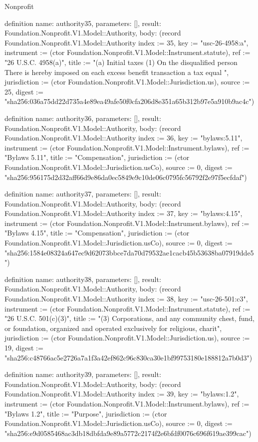 \begin{lexlean}{Nonprofit}
\begin{semanticmodule}
definition{
  name: authority35,
  parameters: [],
  result: Foundation.Nonprofit.V1.Model::Authority,
  body: (record Foundation.Nonprofit.V1.Model::Authority {index := 35, key := "usc-26-4958:a", instrument := (ctor Foundation.Nonprofit.V1.Model::Instrument.statute), ref := "26 U.S.C. 4958(a)", title := "(a) Initial taxes (1) On the disqualified person There is hereby imposed on each excess benefit transaction a tax equal ", jurisdiction := (ctor Foundation.Nonprofit.V1.Model::Jurisdiction.us), source := 25, digest := "sha256:036a75dd22d735a4e89ea49afe50f0cfa206d8e351a65b312b97e5a910b9ac4c"})
}

definition{
  name: authority36,
  parameters: [],
  result: Foundation.Nonprofit.V1.Model::Authority,
  body: (record Foundation.Nonprofit.V1.Model::Authority {index := 36, key := "bylaws:5.11", instrument := (ctor Foundation.Nonprofit.V1.Model::Instrument.bylaws), ref := "Bylaws 5.11", title := "Compensation", jurisdiction := (ctor Foundation.Nonprofit.V1.Model::Jurisdiction.usCo), source := 0, digest := "sha256:956175d2d32aff66d9e86da0ec5849e9c10de06c0795fc56792f2e97f5ecfdaf"})
}

definition{
  name: authority37,
  parameters: [],
  result: Foundation.Nonprofit.V1.Model::Authority,
  body: (record Foundation.Nonprofit.V1.Model::Authority {index := 37, key := "bylaws:4.15", instrument := (ctor Foundation.Nonprofit.V1.Model::Instrument.bylaws), ref := "Bylaws 4.15", title := "Compensation", jurisdiction := (ctor Foundation.Nonprofit.V1.Model::Jurisdiction.usCo), source := 0, digest := "sha256:1584e08324a647ec9d62073bbce7da70d79532ae1cacb45b53638ba07919dde5"})
}

definition{
  name: authority38,
  parameters: [],
  result: Foundation.Nonprofit.V1.Model::Authority,
  body: (record Foundation.Nonprofit.V1.Model::Authority {index := 38, key := "usc-26-501:c3", instrument := (ctor Foundation.Nonprofit.V1.Model::Instrument.statute), ref := "26 U.S.C. 501(c)(3)", title := "(3) Corporations, and any community chest, fund, or foundation, organized and operated exclusively for religious, charit", jurisdiction := (ctor Foundation.Nonprofit.V1.Model::Jurisdiction.us), source := 19, digest := "sha256:c48766ac5e2726a7a1f3a42ef862c96c830ca30e1bf99753180e188812a7b0d3"})
}

definition{
  name: authority39,
  parameters: [],
  result: Foundation.Nonprofit.V1.Model::Authority,
  body: (record Foundation.Nonprofit.V1.Model::Authority {index := 39, key := "bylaws:1.2", instrument := (ctor Foundation.Nonprofit.V1.Model::Instrument.bylaws), ref := "Bylaws 1.2", title := "Purpose", jurisdiction := (ctor Foundation.Nonprofit.V1.Model::Jurisdiction.usCo), source := 0, digest := "sha256:e9d0585468ac3db18dbfda9e89a5772c2174f2e6bfdf0076c696f619ae399cac"})
}


\end{semanticmodule}
\end{lexlean}

